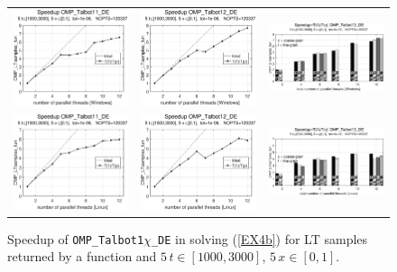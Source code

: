 \documentclass[a4paper,10pt]{report}%
\begin{document}
\begin{figure}[htb]
\centering
\begin{tabular}{ccc} %
\includegraphics[height=0.2\textwidth]{./FIGS/EX4b/EX4b_fun_speedup_11_5t_1000_Windows.eps} &
\includegraphics[height=0.2\textwidth]{./FIGS/EX4b/EX4b_fun_speedup_12_5t_1000_Windows.eps} &
\includegraphics[height=0.2\textwidth,keepaspectratio=true]{./FIGS/EX4b/EX4b_fun_speedup_13_5t_1000_Windows.eps} \\
\includegraphics[height=0.2\textwidth]{./FIGS/EX4b/EX4b_fun_speedup_11_5t_1000_Linux.eps} &
\includegraphics[height=0.2\textwidth]{./FIGS/EX4b/EX4b_fun_speedup_12_5t_1000_Linux.eps} &
\includegraphics[height=0.2\textwidth,keepaspectratio=true]{./FIGS/EX4b/EX4b_fun_speedup_13_5t_1000_Linux.eps}
\end{tabular}
\caption{\small Speedup of {\tt OMP\_Talbot1$\chi$\_DE} in solving (\ref{EX4b}) for LT samples
returned by a function and $5\,t\in[1000,3000]$, $5\,x\in[0,1]$.}
\label{PAR_EX4b_speedup_fun4}
\end{figure}
\end{document}
